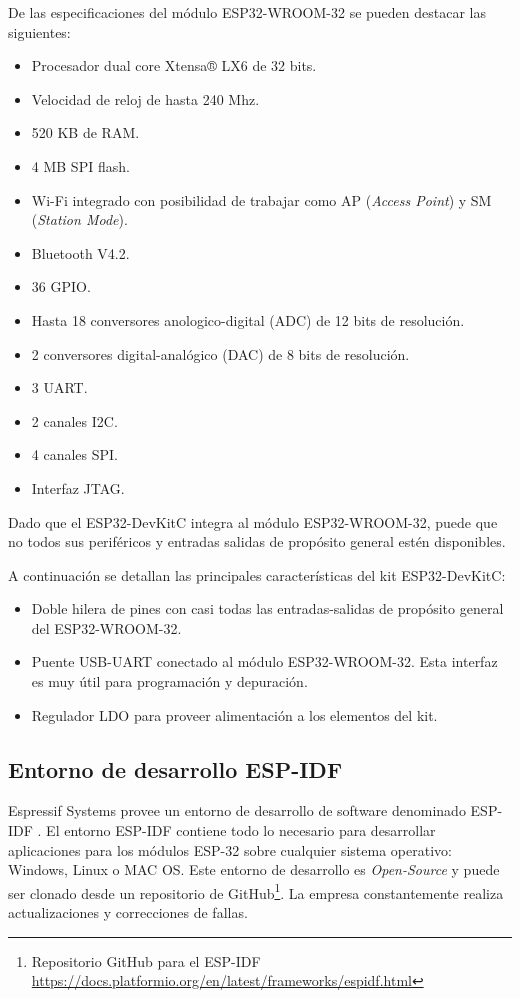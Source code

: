 De las especificaciones del módulo ESP32-WROOM-32 se pueden destacar las siguientes:
\begin{itemize}
\item Procesador dual core Xtensa® LX6 de 32 bits.
\item Velocidad de reloj de hasta 240 Mhz.
\item 520 KB de RAM.
\item 4 MB SPI flash.
\item Wi-Fi integrado con posibilidad de trabajar como AP (\textit{Access Point}) y SM (\textit{Station Mode}).
\item Bluetooth V4.2.
\item 36 GPIO.
\item Hasta 18 conversores anologico-digital (ADC) de 12 bits de resolución.
\item 2 conversores digital-analógico (DAC) de 8 bits de resolución.
\item 3 UART.
\item 2 canales I2C.
\item 4 canales SPI.
\item Interfaz JTAG.
\end{itemize}

Dado que el ESP32-DevKitC integra al módulo ESP32-WROOM-32, puede que no todos sus periféricos y entradas salidas de propósito general estén disponibles. 

A continuación se detallan las principales características del kit ESP32-DevKitC:
\begin{itemize}
\item Doble hilera de pines con casi todas las entradas-salidas de propósito general del ESP32-WROOM-32.
\item Puente USB-UART conectado al módulo ESP32-WROOM-32. Esta interfaz es muy útil para programación y depuración.
\item Regulador LDO para proveer alimentación a los elementos del kit. 
\end{itemize}

\subsection{Entorno de desarrollo ESP-IDF}
\label{sec:ESPIDF}

Espressif Systems provee un entorno de desarrollo de software denominado ESP-IDF \citep{ESPIDF}. El entorno ESP-IDF contiene todo lo necesario para desarrollar aplicaciones para los módulos ESP-32 sobre cualquier sistema operativo: Windows, Linux o MAC OS. Este entorno de desarrollo es \textit{Open-Source} y puede ser clonado desde un repositorio de GitHub\footnote{Repositorio GitHub para el ESP-IDF \url{https://docs.platformio.org/en/latest/frameworks/espidf.html}}. La empresa constantemente realiza actualizaciones y correcciones de fallas.

